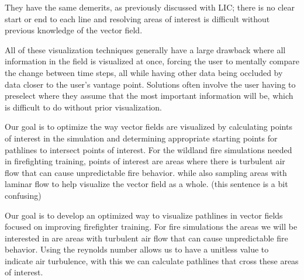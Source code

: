 They have the same demerits, as previously discussed with LIC; there is no clear start or end to each line and resolving areas of interest is difficult without previous knowledge of the vector field. \par

All of these visualization techniques generally have a large drawback where all information in the field is visualized at once, forcing the user to mentally compare the change between time steps, all while having other data being occluded by data closer to the user’s vantage point. Solutions often involve the user having to  preselect where they assume that the most important information will be, which is difficult to do without prior visualization. 


Our goal is to optimize the way vector fields are visualized by calculating points of interest in the simulation and determining appropriate starting points for pathlines to intersect points of interest. For the wildland fire simulations needed in firefighting training, points of interest are areas where there is turbulent air flow that can cause unpredictable fire behavior. while also sampling areas with laminar flow to help visualize the vector field as a whole. (this sentence is a bit confusing)

\color{red}
Our goal is to develop an optimized way to visualize pathlines in vector fields focused on improving firefighter training. For fire simulations the areas we will be interested in are areas with turbulent air flow that can cause unpredictable fire behavior.  Using the reynolds number allows us to have a unitless value to indicate air turbulence, with this we can calculate pathlines that cross these areas of interest.
\color{black}










